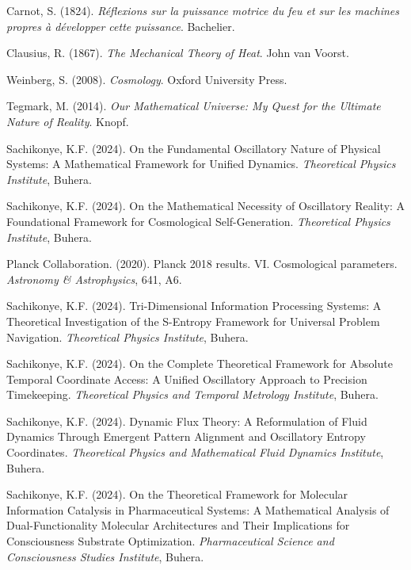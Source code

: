 \documentclass[11pt,a4paper]{article}
\theoremstyle{remark}
\begin{document}

\begin{thebibliography}{99}

Carnot, S. (1824). \textit{Réflexions sur la puissance motrice du feu et sur les machines propres à développer cette puissance}. Bachelier.

Clausius, R. (1867). \textit{The Mechanical Theory of Heat}. John van Voorst.

Weinberg, S. (2008). \textit{Cosmology}. Oxford University Press.

Tegmark, M. (2014). \textit{Our Mathematical Universe: My Quest for the Ultimate Nature of Reality}. Knopf.

Sachikonye, K.F. (2024). On the Fundamental Oscillatory Nature of Physical Systems: A Mathematical Framework for Unified Dynamics. \textit{Theoretical Physics Institute}, Buhera.

Sachikonye, K.F. (2024). On the Mathematical Necessity of Oscillatory Reality: A Foundational Framework for Cosmological Self-Generation. \textit{Theoretical Physics Institute}, Buhera.

Planck Collaboration. (2020). Planck 2018 results. VI. Cosmological parameters. \textit{Astronomy \& Astrophysics}, 641, A6.

Sachikonye, K.F. (2024). Tri-Dimensional Information Processing Systems: A Theoretical Investigation of the S-Entropy Framework for Universal Problem Navigation. \textit{Theoretical Physics Institute}, Buhera.

Sachikonye, K.F. (2024). On the Complete Theoretical Framework for Absolute Temporal Coordinate Access: A Unified Oscillatory Approach to Precision Timekeeping. \textit{Theoretical Physics and Temporal Metrology Institute}, Buhera.

Sachikonye, K.F. (2024). Dynamic Flux Theory: A Reformulation of Fluid Dynamics Through Emergent Pattern Alignment and Oscillatory Entropy Coordinates. \textit{Theoretical Physics and Mathematical Fluid Dynamics Institute}, Buhera.

Sachikonye, K.F. (2024). On the Theoretical Framework for Molecular Information Catalysis in Pharmaceutical Systems: A Mathematical Analysis of Dual-Functionality Molecular Architectures and Their Implications for Consciousness Substrate Optimization. \textit{Pharmaceutical Science and Consciousness Studies Institute}, Buhera.


\end{thebibliography}
\end{document}
